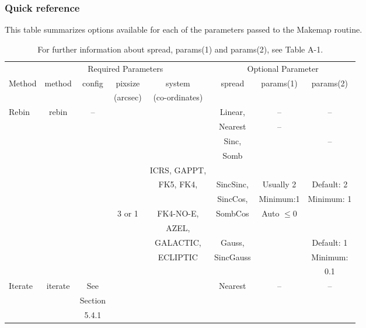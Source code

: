 \documentclass[twoside,11pt]{article}
\renewcommand{\_}{\texttt{\symbol{95}}}
\begin{document}
\subsubsection{Quick reference}

This table summarizes options available for each of the parameters
passed to the Makemap routine.

\begin{table}
\begin{tabular}{lccccccc}
\hline
        & \multicolumn{4}{c}{Required Parameters}           & \multicolumn{3}{c}{Optional Parameter} \\
Method & method    &  config   &    pixsize   &   system         &  spread    & params(1) & params(2) \\
       &           &           &   (arcsec)   &  (co-ordinates)  &            &           & \\
\hline
Rebin  & rebin     &  --       &              &                  &  Linear,   &   --      & -- \\
       &           &           &              &                  &  Nearest   &     --       & \\
       &           &           &              &                  &  Sinc,     &              &   -- \\
       &           &           &              &                  &  Somb      &              & \\
       &           &           &              &   ICRS, GAPPT,   &            &              & \\
       &           &           &              &   FK5, FK4,      &  SincSinc, &  Usually 2   &  Default: 2\\
       &           &           &              &                  &  SincCos,  &  Minimum:1   &  Minimum: 1\\
       &           &           &      3 or 1  &   FK4-NO-E,      &  SombCos   & Auto $\leq$0 & \\
       &           &           &              &   AZEL,          &            &              & \\
       &           &           &              &   GALACTIC,      &  Gauss,    &              &   Default: 1\\
       &           &           &              &   ECLIPTIC       &  SincGauss &              &   Minimum:\\
       &           &           &              &                  &            &              &           0.1\\
\hline
Iterate& iterate   &    See    &              &                  &  Nearest   &     --       &   -- \\
       &           &    Section&              &                  &            &              & \\
       &           &    5.4.1  &              &                  &            &              & \\
\hline
\end{tabular}
\caption{For further information about spread, params(1) and params(2), see Table A-1.}
\end{table}
\end{document}
